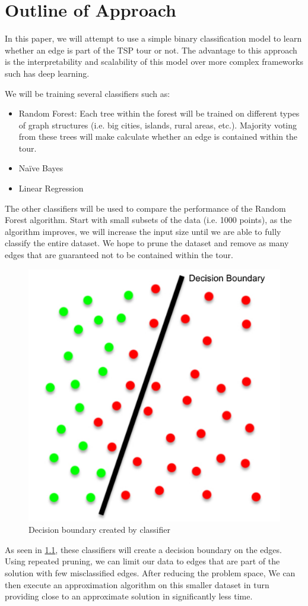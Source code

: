 \documentclass[]{UCD_CS_FYP_Report}
\begin{document}
\chapter{Outline of Approach}
In this paper, we will attempt to use a simple binary classification model to learn whether an edge is part of the TSP tour or not. The advantage to this approach is the interpretability and scalability of this model over more complex frameworks such has deep learning.

We will be training several classifiers such as:
\begin{itemize}
    \item Random Forest: Each tree within the forest will be trained on different types of graph structures (i.e. big cities, islands, rural areas, etc.). Majority voting from these trees will make calculate whether an edge is contained within the tour. 
    \item Naïve Bayes
    \item Linear Regression
\end{itemize}

The other classifiers will be used to compare the performance of the Random Forest algorithm.
Start with small subsets of the data (i.e. 1000 points), as the algorithm improves, we will increase the input size until we are able to fully classify the entire dataset.
We hope to prune the dataset and remove as many edges that are guaranteed not to be contained within the tour. 

\begin{figure}[h]
    \centering
  \includegraphics[width=0.5\linewidth]{Figures/Prune.pdf}
  \caption{Decision boundary created by classifier}
  \label{fig:Prune}
\end{figure}
As seen in \ref{fig:Prune}, these classifiers will create a decision boundary on the edges. Using repeated pruning, we can limit our data to edges that are part of the solution with few misclassified edges. After reducing the problem space, We can then execute an approximation algorithm on this smaller dataset in turn providing close to an approximate solution in significantly less time.
\end{document}
